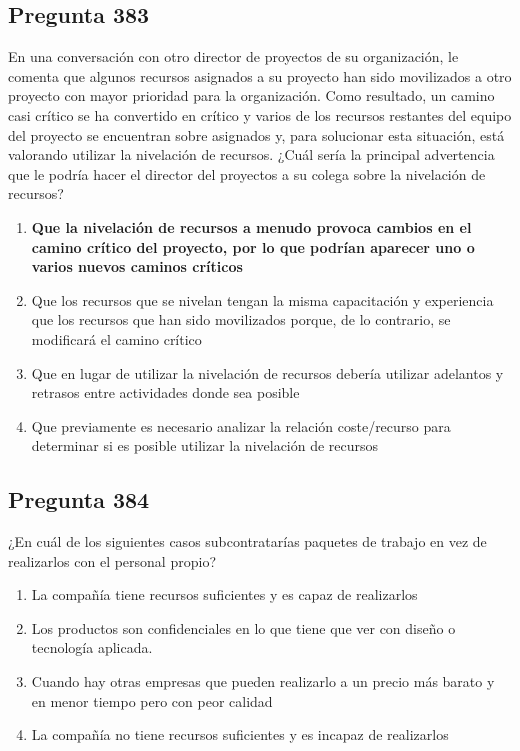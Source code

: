 \documentclass[11pt,a4paper]{article}
\begin{document}
\subsection*{Pregunta 383}
En una conversación con otro director de proyectos de su organización, le comenta que algunos recursos asignados a su proyecto han sido movilizados a otro proyecto con mayor prioridad para la organización. Como resultado, un camino casi crítico se ha convertido en crítico y varios de los recursos restantes del equipo del proyecto se encuentran sobre asignados y, para solucionar esta situación, está valorando utilizar la nivelación de recursos. ¿Cuál sería la principal advertencia que le podría hacer el director del proyectos a su colega sobre la nivelación de recursos?

\begin{enumerate}[label=\alph*)]
  \item \textbf{Que la nivelación de recursos a menudo provoca cambios en el camino crítico del proyecto, por lo que podrían aparecer uno o varios nuevos caminos críticos}
  \item Que los recursos que se nivelan tengan la misma capacitación y experiencia que los recursos que han sido movilizados porque, de lo contrario, se modificará el camino crítico
  \item Que en lugar de utilizar la nivelación de recursos debería utilizar adelantos y retrasos entre actividades donde sea posible
  \item Que previamente es necesario analizar la relación coste/recurso para determinar si es posible utilizar la nivelación de recursos
\end{enumerate}

\subsection*{Pregunta 384}
¿En cuál de los siguientes casos subcontratarías paquetes de trabajo en vez de realizarlos con el personal propio?

\begin{enumerate}[label=\alph*)]
  \item La compañía tiene recursos suficientes y es capaz de realizarlos
  \item Los productos son confidenciales en lo que tiene que ver con diseño o tecnología aplicada.
  \item Cuando hay otras empresas que pueden realizarlo a un precio más barato y en menor tiempo pero con peor calidad
  \item La compañía no tiene recursos suficientes y es incapaz de realizarlos
\end{enumerate}
\end{document}
